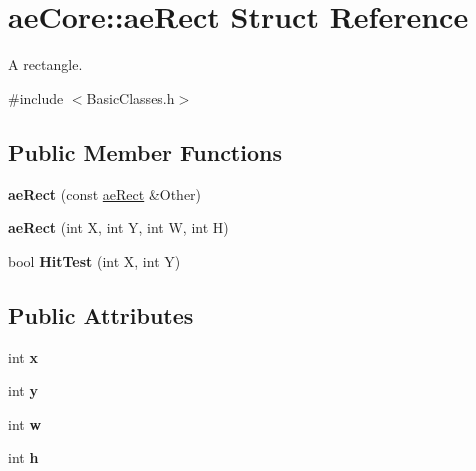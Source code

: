 \hypertarget{structae_core_1_1ae_rect}{}\section{ae\+Core\+:\+:ae\+Rect Struct Reference}
\label{structae_core_1_1ae_rect}


A rectangle.  




{\ttfamily \#include $<$Basic\+Classes.\+h$>$}

\subsection*{Public Member Functions}
\begin{DoxyCompactItemize}
\item 
{\bfseries ae\+Rect} (const \hyperlink{structae_core_1_1ae_rect}{ae\+Rect} \&Other)\hypertarget{structae_core_1_1ae_rect_a8fe58b407f8632a98c1d39c711cc2962}{}\label{structae_core_1_1ae_rect_a8fe58b407f8632a98c1d39c711cc2962}

\item 
{\bfseries ae\+Rect} (int X, int Y, int W, int H)\hypertarget{structae_core_1_1ae_rect_a060a4d7ff58761509903faef941d65bf}{}\label{structae_core_1_1ae_rect_a060a4d7ff58761509903faef941d65bf}

\item 
bool {\bfseries Hit\+Test} (int X, int Y)\hypertarget{structae_core_1_1ae_rect_a75326d8a1549f011f5afaf75db74dc3f}{}\label{structae_core_1_1ae_rect_a75326d8a1549f011f5afaf75db74dc3f}

\end{DoxyCompactItemize}
\subsection*{Public Attributes}
\begin{DoxyCompactItemize}
\item 
int {\bfseries x}\hypertarget{structae_core_1_1ae_rect_a80094e4251c2bdf1d07fb71afc2b9a26}{}\label{structae_core_1_1ae_rect_a80094e4251c2bdf1d07fb71afc2b9a26}

\item 
int {\bfseries y}\hypertarget{structae_core_1_1ae_rect_a67520f1b61e0a7195cafc465f4b8fd41}{}\label{structae_core_1_1ae_rect_a67520f1b61e0a7195cafc465f4b8fd41}

\item 
int {\bfseries w}\hypertarget{structae_core_1_1ae_rect_ae7f80fe08b22f20e35fe1a3a983da7d8}{}\label{structae_core_1_1ae_rect_ae7f80fe08b22f20e35fe1a3a983da7d8}

\item 
int {\bfseries h}\hypertarget{structae_core_1_1ae_rect_ab96e550c3f109e0decf391c52af5015a}{}\label{structae_core_1_1ae_rect_ab96e550c3f109e0decf391c52af5015a}

\end{DoxyCompactItemize}


